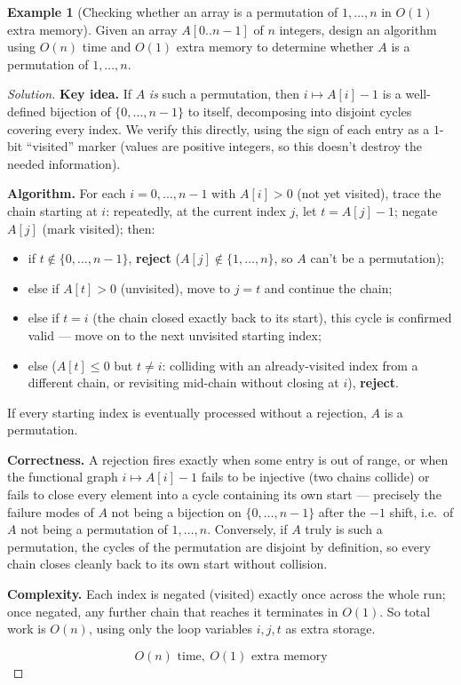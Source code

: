 \documentclass[11pt]{article}
\theoremstyle{definition}
\newtheorem{example}{Example}[section]
\begin{document}
\begin{example}[Checking whether an array is a permutation of $1,\dots,n$ in $O(1)$ extra memory]
Given an array $A[0..n-1]$ of $n$ integers, design an algorithm using $O(n)$ time and $O(1)$ extra memory to determine whether $A$ is a permutation of $1,\dots,n$.
\end{example}
\begin{proof}[Solution]
\textbf{Key idea.} If $A$ \emph{is} such a permutation, then $i\mapsto A[i]-1$ is a well-defined bijection of $\{0,\dots,n-1\}$ to itself, decomposing into disjoint cycles covering every index. We verify this directly, using the sign of each entry as a $1$-bit ``visited'' marker (values are positive integers, so this doesn't destroy the needed information).

\textbf{Algorithm.} For each $i=0,\dots,n-1$ with $A[i]>0$ (not yet visited), trace the chain starting at $i$: repeatedly, at the current index $j$, let $t=A[j]-1$; negate $A[j]$ (mark visited); then:
\begin{itemize}
\item if $t\notin\{0,\dots,n-1\}$, \textbf{reject} ($A[j]\notin\{1,\dots,n\}$, so $A$ can't be a permutation);
\item else if $A[t]>0$ (unvisited), move to $j=t$ and continue the chain;
\item else if $t=i$ (the chain closed exactly back to its start), this cycle is confirmed valid — move on to the next unvisited starting index;
\item else ($A[t]\le0$ but $t\ne i$: colliding with an already-visited index from a different chain, or revisiting mid-chain without closing at $i$), \textbf{reject}.
\end{itemize}
If every starting index is eventually processed without a rejection, $A$ is a permutation.

\textbf{Correctness.} A rejection fires exactly when some entry is out of range, or when the functional graph $i\mapsto A[i]-1$ fails to be injective (two chains collide) or fails to close every element into a cycle containing its own start — precisely the failure modes of $A$ not being a bijection on $\{0,\dots,n-1\}$ after the $-1$ shift, i.e.\ of $A$ not being a permutation of $1,\dots,n$. Conversely, if $A$ truly is such a permutation, the cycles of the permutation are disjoint by definition, so every chain closes cleanly back to its own start without collision.

\textbf{Complexity.} Each index is negated (visited) exactly once across the whole run; once negated, any further chain that reaches it terminates in $O(1)$. So total work is $O(n)$, using only the loop variables $i,j,t$ as extra storage.

\[
\boxed{O(n)\text{ time},\ O(1)\text{ extra memory}}
\]
\end{proof}
\end{document}
